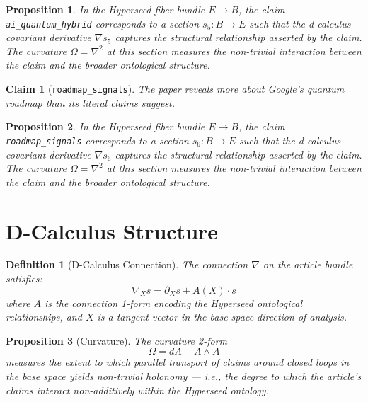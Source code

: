 \documentclass{article}
\newtheorem{claim}{Claim}
\newtheorem{definition}{Definition}
\newtheorem{proposition}{Proposition}
\begin{document}
\begin{proposition}
In the Hyperseed fiber bundle $E \to B$, the claim \texttt{ai_quantum_hybrid} corresponds to a section $s_5: B \to E$ such that the d-calculus covariant derivative $\nabla s_5$ captures the structural relationship asserted by the claim. The curvature $\Omega = \nabla^2$ at this section measures the non-trivial interaction between the claim and the broader ontological structure.
\end{proposition}

\begin{claim}[\texttt{roadmap_signals}]
The paper reveals more about Google's quantum roadmap than its literal claims suggest.
\end{claim}

\begin{proposition}
In the Hyperseed fiber bundle $E \to B$, the claim \texttt{roadmap_signals} corresponds to a section $s_6: B \to E$ such that the d-calculus covariant derivative $\nabla s_6$ captures the structural relationship asserted by the claim. The curvature $\Omega = \nabla^2$ at this section measures the non-trivial interaction between the claim and the broader ontological structure.
\end{proposition}

\section{D-Calculus Structure}

\begin{definition}[D-Calculus Connection]
The connection $\nabla$ on the article bundle satisfies:
\begin{equation}
  \nabla_X s = \partial_X s + A(X) \cdot s
\end{equation}
where $A$ is the connection 1-form encoding the Hyperseed ontological relationships, and $X$ is a tangent vector in the base space direction of analysis.
\end{definition}

\begin{proposition}[Curvature]
The curvature 2-form
\begin{equation}
  \Omega = dA + A \wedge A
\end{equation}
measures the extent to which parallel transport of claims around closed loops in the base space yields non-trivial holonomy --- i.e., the degree to which the article's claims interact non-additively within the Hyperseed ontology.
\end{proposition}
\end{document}
